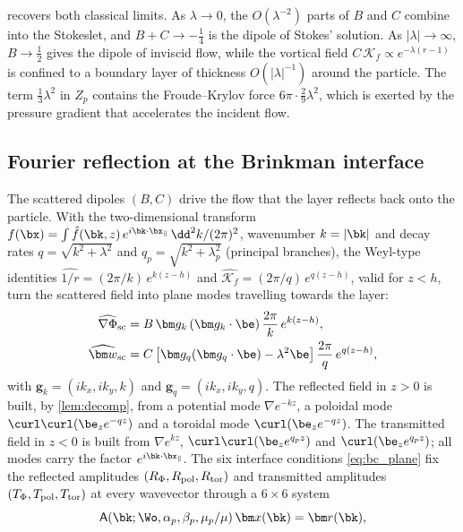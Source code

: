  recovers both classical limits. As $\lambda\to0$, the $O(\lambda^{-2})$ parts of $B$ and $C$ combine
into the Stokeslet, and $B+C\to-\tfrac14$ is the dipole of Stokes' solution. As $|\lambda|\to\infty$, $B\to\tfrac12$
gives the dipole of inviscid flow, while the vortical field $C\,\mathcal K_f\propto e^{-\lambda(r-1)}$ is confined to a
boundary layer of thickness $O(|\lambda|^{-1})$ around the particle. The term $\tfrac13\lambda^2$ in $Z_p$ contains the
Froude--Krylov force $6\pi\cdot\tfrac29\lambda^2$, which is exerted by the pressure gradient that accelerates the incident
flow.

\subsection{Fourier reflection at the Brinkman interface}\label{sec:reflection}
The scattered dipoles $(B,C)$ drive the flow that the layer reflects back onto the particle. With the two-dimensional
transform $f(\bx)=\int\hat f(\bk,z)\,e^{i\bk\cdot\bx_\parallel}\,\dd^2k/(2\pi)^2$, wavenumber $k=|\bk|$ and decay rates
$q=\sqrt{k^2+\lambda^2}$ and $q_p=\sqrt{k^2+\lambda_p^2}$ (principal branches), the Weyl-type identities
$\widehat{1/r}=(2\pi/k)\,e^{k(z-h)}$ and $\widehat{\mathcal K_f}=(2\pi/q)\,e^{q(z-h)}$, valid for $z<h$, turn the
scattered field into plane modes travelling towards the layer:
\begin{subequations}\label{eq:incident_fourier}
\begin{align}
  \widehat{\nabla\Phi}_{\rm sc}&=B\,\bm g_k\,(\bm g_k\cdot\be)\,\frac{2\pi}{k}\,e^{k(z-h)},\\
  \widehat{\bm w}_{\rm sc}&=C\left[\bm g_q(\bm g_q\cdot\be)-\lambda^2\be\right]\frac{2\pi}{q}\,e^{q(z-h)},
\end{align}
\end{subequations}
with $\bm g_k=(ik_x,ik_y,k)$ and $\bm g_q=(ik_x,ik_y,q)$. The reflected field in $z>0$ is built, by \cref{lem:decomp},
from a potential mode $\nabla e^{-kz}$, a poloidal mode $\curl\curl(\be_ze^{-qz})$ and a toroidal mode
$\curl(\be_ze^{-qz})$. The transmitted field in $z<0$ is built from $\nabla e^{kz}$, $\curl\curl(\be_ze^{q_pz})$ and
$\curl(\be_ze^{q_pz})$; all modes carry the factor $e^{i\bk\cdot\bx_\parallel}$. The six interface conditions
\eqref{eq:bc_plane} fix the reflected amplitudes $(R_\Phi,R_{\rm pol},R_{\rm tor})$ and transmitted amplitudes
$(T_\Phi,T_{\rm pol},T_{\rm tor})$ at every wavevector through a $6\times6$ system
\begin{equation}
  \mathsf A(\bk;\Wo,\alpha_p,\beta_p,\mu_p/\mu)\,\bm x(\bk)=\bm r(\bk),
  \label{eq:interface_system}
\end{equation}
